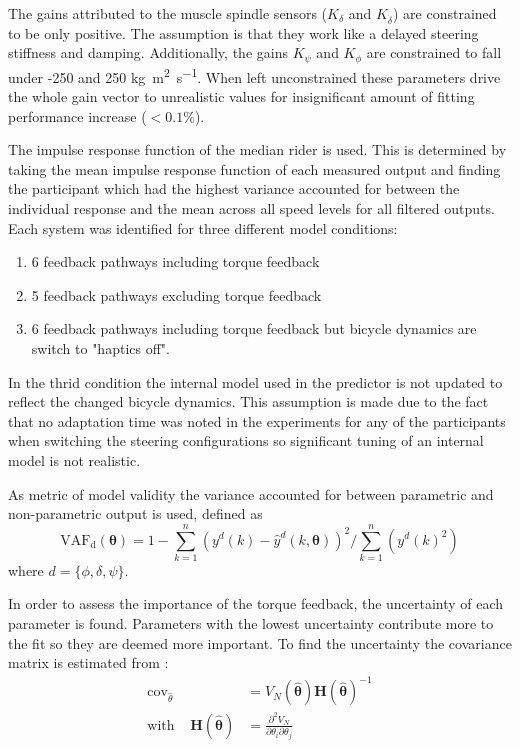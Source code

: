 The gains attributed to the muscle spindle sensors (\ensuremath{K_\delta} and \ensuremath{K_{\dot{\delta}}}) are constrained to be only positive. The assumption is that they work like a delayed steering stiffness and damping. Additionally, the gains \ensuremath{K_\psi} and \ensuremath{K_\phi}  are constrained to fall under -250 and 250 \si{\kilogram\square\meter\per\second}.  When left unconstrained these parameters drive the whole gain vector to unrealistic values for insignificant amount of fitting performance increase (\ensuremath{<0.1\%}).

The impulse response function of the median rider is used. This is determined by taking the mean impulse response function of each measured output and finding the participant which had the highest variance accounted for between the individual response and the mean across all speed levels for all filtered outputs. Each system was identified for three different model conditions: 
\begin{enumerate}
    \item  6 feedback pathways including torque feedback
    \item  5 feedback pathways excluding torque feedback
    \item  6 feedback pathways including torque feedback but bicycle dynamics are switch to "haptics off".
\end{enumerate}
In the thrid condition the internal model used in the predictor is not updated to reflect the changed bicycle dynamics. This assumption is made due to the fact that no adaptation time  was noted in the experiments for any of the participants when switching the steering configurations so significant tuning of an internal model is not realistic. 

 As metric of model validity the variance accounted for between parametric and non-parametric output is used, defined as
\begin{equation}
\mathrm{VAF_d}(\boldsymbol{\theta})=1 -\sum_{k=1}^{n}\left(y^{d}(k)-\hat{y}^{d}(k, \boldsymbol{\theta})\right)^{2} / \sum_{k=1}^{n}\left(y^{d}(k)^{2}\right)
\label{eq:VAF}
\end{equation} 
where \ensuremath{d=\{\phi,\delta,\psi\}}. 

In order to assess the importance of the torque feedback, the uncertainty of each parameter is found. Parameters with the lowest uncertainty contribute more to the fit so they are deemed more important. To find the uncertainty the covariance matrix is estimated from :
\begin{align}
    \operatorname{cov}_{\hat{\theta}}  &=V_N(\boldsymbol{\hat{\theta}})\boldsymbol{H}(\boldsymbol{\hat{\theta}})^{-1}
    \label{fig:cov_mat}
    \\ \text{with} \;\;\;\;  \boldsymbol{H}(\boldsymbol{\hat{\theta}})&= \frac{\partial^{2} V_N}{\partial \theta_{i} \partial \theta_{j}}
\end{align}

